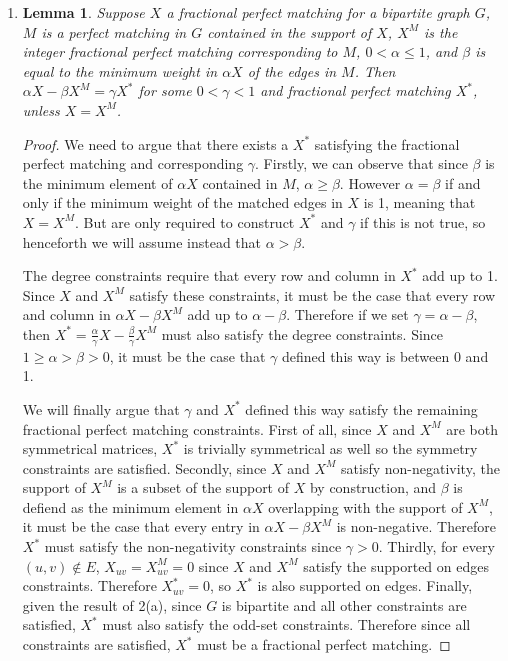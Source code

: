 \documentclass{hmcpset}
\newtheorem{lemma}{Lemma}
\begin{document}
\begin{solution}
\begin{enumerate}[label=(\Alph*)]
\item

\begin{lemma}
  Suppose $X$ a fractional perfect matching for a bipartite graph $G$,
  $M$ is a perfect matching in $G$ contained in the support of $X$,
  $X^M$ is the integer fractional perfect matching corresponding to $M$,
  $0 < \alpha \leq 1$, and $\beta$ is equal to the minimum weight in $\alpha X$
  of the edges in $M$. Then $\alpha X - \beta X^M = \gamma X^*$ for some
  $0 < \gamma < 1$ and fractional perfect matching $X^*$, unless $X = X^M$.
\end{lemma}

\begin{proof}

  We need to argue that there exists a $X^*$ satisfying the fractional
  perfect matching and corresponding $\gamma$.
  Firstly, we can observe that since $\beta$ is the minimum element of
  $\alpha X$ contained in $M$, $\alpha \geq \beta$. However $\alpha = \beta$
  if and only if the minimum weight of the matched edges in $X$ is 1, meaning
  that $X = X^M$. But are only required to construct $X^*$ and $\gamma$ if
  this is not true, so henceforth we will assume instead that $\alpha > \beta$.

  The degree constraints require that every row and column in $X^*$ add up to
  1. Since $X$ and $X^M$ satisfy these constraints, it
  must be the case that every row and column in $\alpha X - \beta X^M$
  add up to $\alpha - \beta$. Therefore if we set $\gamma = \alpha - \beta$,
  then $X^* = \frac{\alpha}{\gamma} X - \frac{\beta}{\gamma} X^M$ must
  also satisfy the degree constraints. Since $1 \geq \alpha > \beta > 0$, it must
  be the case that $\gamma$ defined this way is between 0 and 1.
  
  We will finally argue that $\gamma$ and $X^*$ defined this way satisfy
  the remaining fractional perfect matching constraints. First of all, since
  $X$ and $X^M$ are both symmetrical matrices, $X^*$ is trivially symmetrical
  as well so the symmetry constraints are satisfied. Secondly, since $X$
  and $X^M$ satisfy non-negativity, the support of $X^M$ is a subset of
  the support of $X$ by construction, and $\beta$ is defiend as the minimum
  element in $\alpha X$ overlapping with the support of $X^M$, it must
  be the case that every entry in
  $\alpha X - \beta X^M$ is non-negative. Therefore $X^*$ must satisfy
  the non-negativity constraints since
  $\gamma > 0$. Thirdly, for every $(u, v) \notin E$, $X_{uv} = X^M_{uv} = 0$
  since $X$ and $X^M$ satisfy the supported on edges constraints.
  Therefore $X^*_{uv} = 0$, so $X^*$ is also supported on edges. Finally, given
  the result of 2(a), since $G$ is bipartite and all other constraints
  are satisfied, $X^*$ must also satisfy the odd-set constraints.
  Therefore since all constraints are satisfied, $X^*$ must be a fractional
  perfect matching.
\end{proof}


\end{enumerate}
\end{solution}
\end{document}

